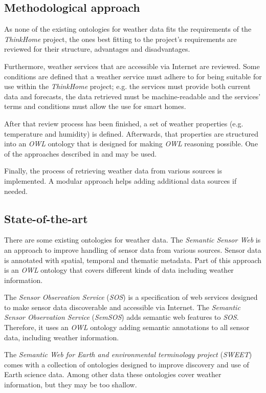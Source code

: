 \documentclass{scrartcl}
\begin{document}
\subsection*{Methodological approach}
As none of the existing ontologies for weather data fits the requirements of the \textit{ThinkHome} project, the ones best fitting to the project's requirements are reviewed for their structure, advantages and disadvantages.

Furthermore, weather services that are accessible via Internet are reviewed. Some conditions are defined that a weather service must adhere to for being suitable for use within the \textit{ThinkHome} project; e.g. the services must provide both current data and forecasts, the data retrieved must be machine-readable and the services' terms and conditions must allow the use for smart homes.

After that review process has been finished, a set of weather properties (e.g. temperature and humidity) is defined. Afterwards, that properties are structured into an \textit{OWL} ontology that is designed for making \textit{OWL} reasoning possible. One of the approaches described in \cite{Ontology101} and \cite{SoftwareEngineeringOntology} may be used.

Finally, the process of retrieving weather data from various sources is implemented. A modular approach helps adding additional data sources if needed.

\subsection*{State-of-the-art}

There are some existing ontologies for weather data. The \textit{Semantic Sensor Web} \cite{SemanticSensorWeb} is an approach to improve handling of sensor data from various sources. Sensor data is annotated with spatial, temporal and thematic metadata. Part of this approach is an \textit{OWL} ontology that covers different kinds of data including weather information.

The \textit{Sensor Observation Service} (\textit{SOS}) \cite{SOS} is a specification of web services designed to make sensor data discoverable and accessible via Internet. The \textit{Semantic Sensor Observation Service} (\textit{SemSOS}) \cite{SemSOS} adds semantic web features to \textit{SOS}. Therefore, it uses an \textit{OWL} ontology adding semantic annotations to all sensor data, including weather information.

The \textit{Semantic Web for Earth and environmental terminology project} (\textit{SWEET}) \cite{SWEET} comes with a collection of ontologies designed to improve discovery and use of Earth science data. Among other data these ontologies cover weather information, but they may be too shallow.
\end{document}
